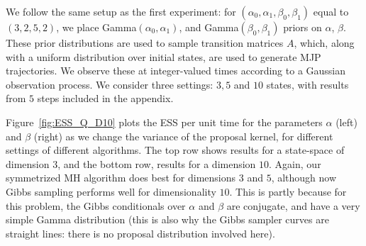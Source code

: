 We follow the same setup as the first experiment:
for $(\alpha_0,\alpha_1,\beta_0,\beta_1)$ equal to $(3,2,5,2)$,
we place Gamma$(\alpha_0,\alpha_1)$, and Gamma$(\beta_0, \beta_1)$ priors on 
$\alpha$, $\beta$. These prior distributions are used to sample transition 
matrices $A$, which, along with a uniform distribution over initial states,
are used to generate MJP trajectories. We observe these at integer-valued
times according to a Gaussian observation process.
We consider three settings: $3, 5$ and $10$ states, with results from $5$ 
steps included in the appendix. 

  Figure~\ref{fig:ESS_Q_D10} plots the ESS 
  per unit time for the parameters $\alpha$ (left) and $\beta$ (right) as we 
  change the variance of the proposal kernel, for different settings of
  different algorithms. The top row shows results for a state-space
  of dimension $3$, and the bottom row, results for a dimension
  $10$.
  Again, our symmetrized  MH algorithm does best for dimensions
  $3$ and $5$, although now Gibbs sampling performs well for dimensionality $10$.
  This is partly because for this problem, the Gibbs conditionals over $\alpha$
  and $\beta$ are conjugate, and have a very simple Gamma distribution
  (this is also why the Gibbs sampler curves are straight lines: there is no
  proposal distribution involved here).
